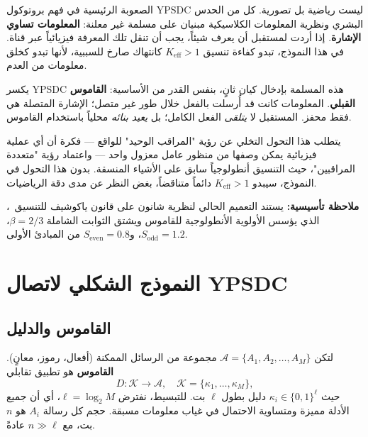 \documentclass[12pt,a4paper]{article}
\theoremstyle{remark}
\begin{document}
	الصعوبة الرئيسية في فهم بروتوكول YPSDC ليست رياضية بل تصورية. كل من الحدس البشري ونظرية المعلومات الكلاسيكية مبنيان على مسلمة غير معلنة: \textbf{المعلومات تساوي الإشارة}. إذا أردت لمستقبل أن يعرف شيئاً، يجب أن تنقل تلك المعرفة فيزيائياً عبر قناة. في هذا النموذج، تبدو كفاءة تنسيق \(K_{\mathrm{eff}} > 1\) كانتهاك صارخ للسببية، لأنها تبدو كخلق معلومات من العدم.
	
	يكسر YPSDC هذه المسلمة بإدخال كيان ثانٍ، بنفس القدر من الأساسية: \textbf{القاموس القبلي}. المعلومات كانت قد أُرسلت بالفعل خلال طور غير متصل؛ الإشارة المتصلة هي فقط محفز. المستقبل لا \emph{يتلقى} الفعل الكامل؛ بل \emph{يعيد بنائه} محلياً باستخدام القاموس.
	
	يتطلب هذا التحول التخلي عن رؤية "المراقب الوحيد" للواقع — فكرة أن أي عملية فيزيائية يمكن وصفها من منظور عامل معزول واحد — واعتماد رؤية "متعددة المراقبين"، حيث التنسيق أنطولوجياً سابق على الأشياء المنسقة. بدون هذا التحول في النموذج، سيبدو \(K_{\mathrm{eff}} > 1\) دائماً متناقضاً، بغض النظر عن مدى دقة الرياضيات.
	
	\medskip
	
	\textbf{ملاحظة تأسيسية:} يستند التعميم الحالي لنظرية شانون على قانون ياكوشيف للتنسيق~\cite{YakushevLaw2026}، الذي يؤسس الأولوية الأنطولوجية للقاموس ويشتق الثوابت الشاملة \(\beta = 2/3\)، \(S_{\mathrm{odd}} = 1.2\)، و\(S_{\mathrm{even}} = 0.8\) من المبادئ الأولى.
	
	\section{النموذج الشكلي لاتصال YPSDC}
	\label{sec:model}
	
	\subsection{القاموس والدليل}
	
	لتكن \(\mathcal{A} = \{A_1, A_2, \dots, A_M\}\) مجموعة من الرسائل الممكنة (أفعال، رموز، معانٍ). \textbf{القاموس} هو تطبيق تقابلي
	\begin{equation}
		D: \mathcal{K} \to \mathcal{A}, \quad \mathcal{K} = \{\kappa_1, \dots, \kappa_M\},
	\end{equation}
	حيث \(\kappa_i \in \{0,1\}^\ell\) دليل بطول \(\ell\) بت. للتبسيط، نفترض \(\ell = \log_2 M\)، أي أن جميع الأدلة مميزة ومتساوية الاحتمال في غياب معلومات مسبقة. حجم كل رسالة \(A_i\) هو \(n\) بت، مع \(n \gg \ell\) عادةً.
	
\end{document}
